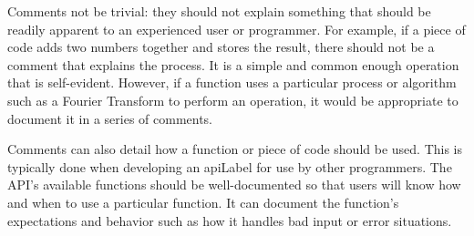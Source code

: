 Comments not be trivial: they should not explain something
that should be readily apparent to an experienced user or
programmer.  For example, if a piece of code adds two
numbers together and stores the result, there should not
be a comment that explains the process.  It is a simple and
common enough operation that is self-evident.  However,
if a function uses a particular process or algorithm such
as a Fourier Transform to perform an operation, it would
be appropriate to document it in a series of comments.

Comments can also detail how a function or piece of code
should be used.  This is typically done when developing an
\gls{apiLabel} for use by other programmers.  The API's
available functions should be well-documented so that users
will know how and when to use a particular function.  It
can document the function's expectations and behavior such
as how it handles bad input or error situations.

